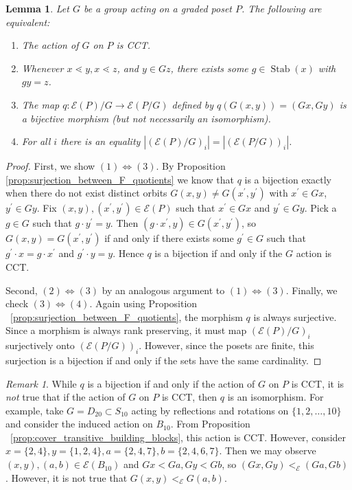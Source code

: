 \documentclass[smallextended, envcountsame, numbook]{svjour3}
\theoremstyle{plain}
\newtheorem{lem}[thm]{Lemma}
\theoremstyle{definition}
\theoremstyle{remark}
\newtheorem{rmk}[thm]{Remark}
\numberwithin{equation}{section}
\renewcommand{\iff}{\Leftrightarrow}
\newcommand\Stab{\operatorname{Stab}}
\begin{document}
\begin{lem}
\label{lem:cover_transitive_equivalence}
Let $G$ be a group acting on a graded poset $P$. The following are equivalent:
\begin{enumerate}
  \item The action of $G$ on $P$ is CCT.
  \item Whenever $x \lessdot y,x \lessdot z$, and $y \in Gz$, there exists some $g \in \Stab(x)$ with $gy = z$.
  \item The map $q\colon \mathcal E(P)/G\rightarrow \mathcal E(P/G)$ defined by $q(G(x, y)) = (Gx,Gy)$ is a bijective morphism (but not necessarily an isomorphism).
  \item For all $i$ there is an equality $|(\mathcal E(P)/G)_i|=| (\mathcal E(P/G))_i|$.
\end{enumerate}
\end{lem}
\begin{proof}
First, we show $(1) \iff (3)$. By Proposition \ref{prop:surjection_between_F_quotients} we know that $q$ is a bijection exactly when there do not exist distinct orbits $G(x, y) \ne G(x^\prime, y^\prime)$ with $x^\prime\in Gx$, $y^\prime\in Gy$.  Fix $(x, y), (x^\prime, y^\prime)\in \mathcal E(P)$ such that $x^\prime\in Gx$ and $y^\prime\in Gy$.  Pick a $g\in G$ such that $g\cdot y^\prime = y$.  Then $(g\cdot x^\prime, y)\in G(x^\prime, y^\prime)$, so $G(x, y) = G(x^\prime, y^\prime)$ if and only if there exists some $g^\prime\in G$ such that $g^\prime\cdot x = g\cdot x^\prime$ and $g^\prime\cdot y = y$. Hence $q$ is a bijection if and only if the $G$ action is CCT.

Second, $(2) \iff (3)$ by an analogous argument to $(1) \iff (3)$.
Finally, we check $(3)\iff (4)$. Again using Proposition ~\ref{prop:surjection_between_F_quotients}, the morphism $q$ is always surjective. Since a morphism is always rank preserving, it must map $(\mathcal E(P)/G)_i$ surjectively onto $(\mathcal E(P/G))_i$. However, since the posets are finite, this surjection is a bijection if and only if the sets have the same cardinality.
\end{proof}

\begin{rmk}
While $q$ is a bijection if and only if the action of $G$ on $P$ is CCT, it is {\it not} true that if the action of $G$ on $P$ is CCT, then $q$ is an isomorphism.  For example, take $G=D_{20} \subset S_{10}$ acting by reflections and rotations on $\{1,2,\ldots,10\}$ and consider the induced action on $B_{10}$. From Proposition ~\ref{prop:cover_transitive_building_blocks}, this action is CCT. However, consider $x = \{2,4\},y = \{1,2,4\},a = \{2,4,7\},b = \{2,4,6,7\}$. Then we may observe $(x , y),(a, b) \in \mathcal E(B_{10})$ and $Gx < Ga, Gy < Gb$, so $(Gx, Gy) <_{\mathcal E} (Ga, Gb)$. However, it is not true that $G(x, y)<_{\mathcal E} G(a,b)$.
\end{rmk}
\end{document}
